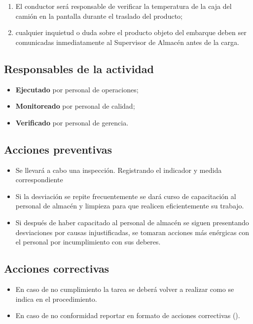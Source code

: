 \begin{enumerate}
	\item El conductor será responsable de verificar la temperatura de la caja del camión en la pantalla durante el traslado del producto;
	\item cualquier inquietud o duda sobre el producto objeto del embarque deben ser comunicadas inmediatamente al Supervisor de Almacén antes de la carga.
\end{enumerate}

\subsection{Responsables de la actividad}

\begin{itemize}
	\item \textbf{Ejecutado} por personal de operaciones;
	\item \textbf{Monitoreado} por personal de calidad;
	\item \textbf{Verificado} por personal de gerencia.
\end{itemize}

\subsection{Acciones preventivas}

\begin{itemize}
	\item Se llevará a cabo una inspección. Registrando el indicador y medida correspondiente
	\item Si la desviación se repite frecuentemente se dará curso de capacitación al personal de almacén y limpieza para que realicen eficientemente su trabajo.
	\item Si después de haber capacitado al personal de almacén se siguen presentando desviaciones por causas injustificadas, se tomaran acciones más enérgicas con el personal por incumplimiento con sus deberes.
\end{itemize}

\subsection{Acciones correctivas}

\begin{itemize}
	\item En caso de no cumplimiento la tarea se deberá volver a realizar como se indica en el procedimiento.
	\item En caso de no conformidad reportar en formato de acciones correctivas (\IdFormAACC).
\end{itemize}

